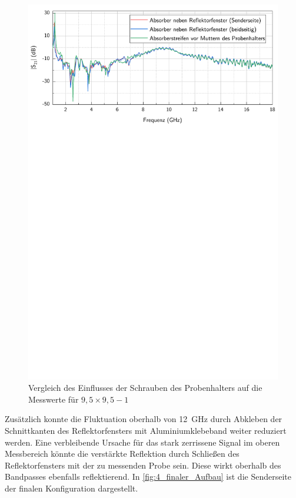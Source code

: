 \begin{figure}[ht]
    \centering
    \includegraphics[page = 3, width = .99\textwidth, trim = 0cm 16.8cm 0cm 0cm, clip]{Abbildungen/Kapitel4/Messergebnisse/9k5x9k5-1.pdf}
    \caption[Vergleich des Einflusses der Schrauben des Probenhalters auf die Messwerte]{Vergleich des Einflusses der Schrauben des Probenhalters auf die Messwerte für \mbox{$9,5\times9,5-1$}}
    \label{fig:4_9k5x9k5-1_Schrauben}
\end{figure}


Zusätzlich konnte die Fluktuation oberhalb von \SI{12}{\giga\hertz} durch Abkleben der Schnittkanten des Reflektorfensters mit Aluminiumklebeband weiter reduziert werden. Eine verbleibende Ursache für das stark zerrissene Signal im oberen Messbereich könnte die verstärkte Reflektion durch Schließen des Reflektorfensters mit der zu messenden Probe sein. Diese wirkt oberhalb des Bandpasses ebenfalls reflektierend. In \Abb\ref{fig:4_finaler_Aufbau} ist die Senderseite der finalen Konfiguration dargestellt.

